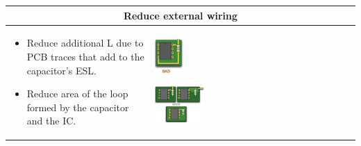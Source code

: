 		\begin{table}[h!]
		\centering
		\begin{tabular}{|m{}|m{}|}
				\multicolumn{2}{c}{\textbf{Reduce external wiring}}
			\\
			\hline
				\begin{itemize}
					\item Reduce additional L due to PCB traces that add to the capacitor's ESL. 
					\item Reduce area of the loop formed by the capacitor and the IC. 
				\end{itemize}
			& 
				\begin{center}\includegraphics[width=0.15\textwidth]{images/BadTrace.png}\end{center}  
				\begin{center}\includegraphics[width=0.25\textwidth]{images/GoodTrace.png}\end{center}  
			\\	
			\hline
			\end{tabular}
		\end{table}	
		

